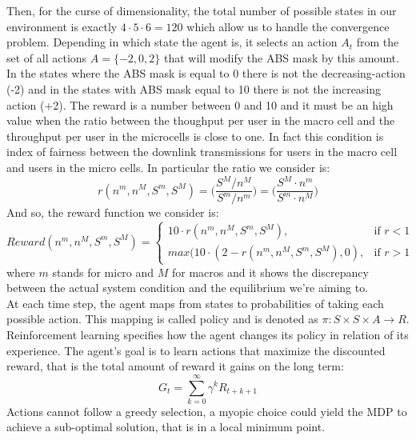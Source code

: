\documentclass[conference,10pt]{IEEEtran}
\begin{document}
Then, for the curse of dimensionality, the total number of possible states in our environment is exactly $4\cdot 5\cdot 6=120$ which allow us to handle the convergence problem. Depending in which state the agent is, it selects an action $A_t$ from the set of all actions $A=\lbrace-2,0,2\rbrace$ that will modify the ABS mask by this amount. In the states where the ABS mask is equal to 0 there is not the decreasing-action (-2) and in the states with ABS mask equal to 10 there is not the increasing action (+2). The reward is a number between 0 and 10 and it must be an high value when the ratio between the thoughput per user in the macro cell and the throughput per user in the microcells is close to one. In fact this condition is index of fairness between the downlink transmissions for users in the macro cell and users in the micro cells. In particular the ratio we consider is: 
\begin{equation*}
r(n^{m},n^{M},S^{m},S^{M})=\bigg(\frac{ S^{M} / n^{M} }{S^{m} / n^{m}} \bigg)= \bigg(\frac{ S^{M} \cdot n^{m}}{S^{m} \cdot n^{M}} \bigg)
\end{equation*}
And so, the reward function we consider is:
\begin{dmath*}
Reward(n^{m},n^{M},S^{m},S^{M}) = \begin{cases} 10 \cdot r(n^{m},n^{M},S^{m},S^{M}), & \mbox{if } r<1 \\ max( 10 \cdot(2 - r(n^{m},n^{M},S^{m},S^{M}),0), & \mbox{if } r>1 \end{cases}
\end{dmath*} 
where $m$ stands for micro and $M$ for macros and it shows the discrepancy between the actual system condition and the equilibrium we're aiming to. \\
At each time step, the agent maps from states to probabilities of taking each possible action. This mapping is called policy and is denoted as $\pi:S \times S \times A \rightarrow R$. Reinforcement
learning specifies how the agent changes its policy in relation of its experience. The agent's goal is to learn actions that maximize the discounted reward, that is the total amount of reward it gains on the long term:
\begin{equation*}
G_t = \sum_{k=0}^{\infty}{\gamma^kR_{t+k+1}}
\end{equation*}
Actions cannot follow a greedy selection, a myopic choice could yield the MDP to achieve a sub-optimal solution, that is in a local minimum point.
\end{document}
